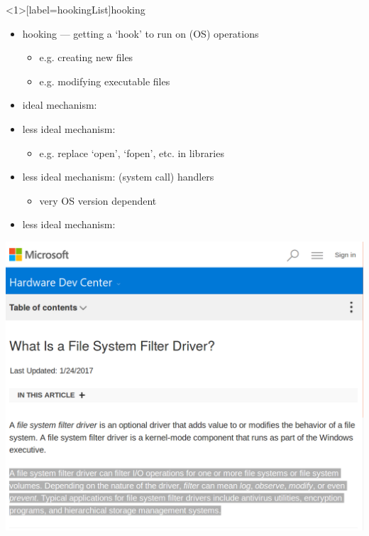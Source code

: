 \begin{frame}<1>[label=hookingList]{hooking}
    \begin{itemize}
    \item hooking --- getting a `hook' to run on (OS) operations
        \begin{itemize}
        \item e.g. creating new files
        \item e.g. modifying executable files
        \end{itemize}
    \item ideal mechanism: 
    \item less ideal mechanism: 
        \begin{itemize}
        \item e.g. replace `open', `fopen', etc. in libraries
        \end{itemize}
    \item less ideal mechanism:  (system call) handlers
        \begin{itemize}
        \item very OS version dependent
        \end{itemize} 
    \item less ideal mechanism: 
    \end{itemize}
\end{frame}


\begin{frame}
\includegraphics[height=0.9\textheight]{../heur-detect/filter-driver} 
\end{frame}

